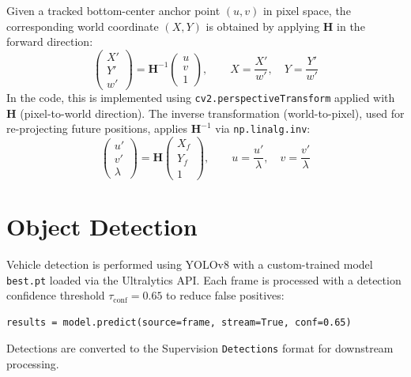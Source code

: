 \documentclass[12pt]{report}
\begin{document}
Given a tracked bottom-center anchor point $(u, v)$ in pixel space, the corresponding world coordinate $(X, Y)$ is obtained by applying $\mathbf{H}$ in the forward direction:
\begin{equation}
    \begin{pmatrix} X' \\ Y' \\ w' \end{pmatrix}
    = \mathbf{H}^{-1}
    \begin{pmatrix} u \\ v \\ 1 \end{pmatrix},
    \qquad
    X = \frac{X'}{w'},\quad Y = \frac{Y'}{w'}
    \label{eq:transform_point}
\end{equation}
In the code, this is implemented using \texttt{cv2.perspectiveTransform} applied with $\mathbf{H}$ (pixel-to-world direction).
The inverse transformation (world-to-pixel), used for re-projecting future positions, applies $\mathbf{H}^{-1}$ via \texttt{np.linalg.inv}:
\begin{equation}
    \begin{pmatrix} u' \\ v' \\ \lambda \end{pmatrix}
    = \mathbf{H}
    \begin{pmatrix} X_f \\ Y_f \\ 1 \end{pmatrix},
    \qquad
    u = \frac{u'}{\lambda},\quad v = \frac{v'}{\lambda}
    \label{eq:inv_transform}
\end{equation}

\section{Object Detection}

Vehicle detection is performed using YOLOv8 with a custom-trained model \texttt{best.pt} loaded via the Ultralytics API.
Each frame is processed with a detection confidence threshold $\tau_\text{conf} = 0.65$ to reduce false positives:
\begin{lstlisting}[caption={YOLOv8 Detection Call},label={lst:yolo}]
results = model.predict(source=frame, stream=True, conf=0.65)
\end{lstlisting}
Detections are converted to the Supervision \texttt{Detections} format for downstream processing.
\end{document}
